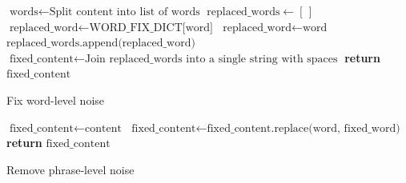 \begin{algorithm}
    \begin{algorithmic}[1]
        \State $\text{words} \gets \text{Split content into list of words}$ 
        \State $\text{replaced\_words} \gets [\,]$
        \State $\text{replaced\_word} \gets \text{WORD\_FIX\_DICT[word]}$ 
        \State $\text{replaced\_word} \gets \text{word}$ 
        \EndIf
        \State $\text{replaced\_words.append(replaced\_word)}$
        \EndFor
        \State $\text{fixed\_content} \gets \text{Join replaced\_words into a single string with spaces}$
        \State \textbf{return} $\text{fixed\_content}$
        \EndProcedure
    \end{algorithmic}
    \caption{Fix word-level noise}
    \label{alg:word_level_noise_fix}
\end{algorithm}

\begin{algorithm}
    \begin{algorithmic}[1]
        \State $\text{fixed\_content} \gets \text{content}$
        \State $\text{fixed\_content} \gets \text{fixed\_content.replace(word, fixed\_word)}$
        \EndFor
        \State \textbf{return} $\text{fixed\_content}$
        \EndProcedure
    \end{algorithmic}
    \caption{Remove phrase-level noise}
    \label{alg:phrase_level_noise_fix}
\end{algorithm}


